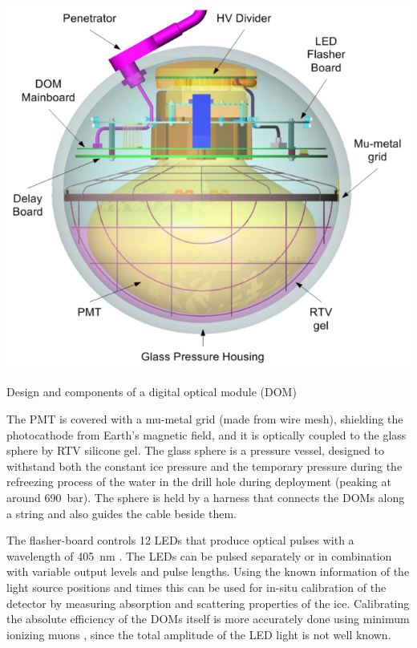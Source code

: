 \begin{marginfigure}
    \includegraphics{figures/icecube_deepcore/DOM_schematic.png}
	\caption[Digital optical module (DOM)]{Design and components of a digital optical module (DOM) \cite{ABBASI2009294_data_acquisition}}
\end{marginfigure}

The PMT is covered with a mu-metal grid (made from wire mesh), shielding the photocathode from Earth's magnetic field, and it is optically coupled to the glass sphere by RTV silicone gel. The glass sphere is a pressure vessel, designed to withstand both the constant ice pressure and the temporary pressure during the refreezing process of the water in the drill hole during deployment (peaking at around \SI{690}{\bar}). The sphere is held by a harness that connects the DOMs along a string and also guides the cable beside them.

The flasher-board controls 12 LEDs that produce optical pulses with a wavelength of \SI{405}{\nano\meter} . The LEDs can be pulsed separately or in combination with variable output levels and pulse lengths. Using the known information of the light source positions and times this can be used for in-situ calibration of the detector by measuring absorption and scattering properties of the ice. Calibrating the absolute efficiency of the DOMs itself is more accurately done using minimum ionizing muons , since the total amplitude of the LED light is not well known.


